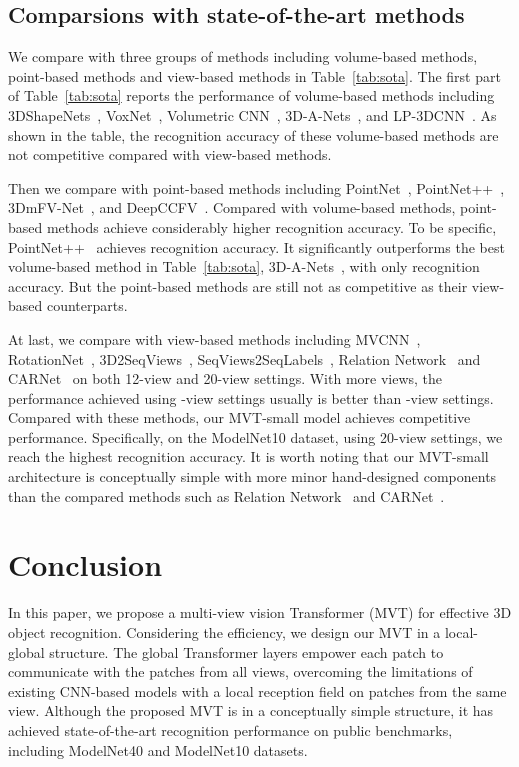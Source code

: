 \documentclass{bmvc2k}
\begin{document}
\subsection{Comparsions with state-of-the-art methods}
We compare with three groups of methods including volume-based methods, point-based methods and view-based methods in Table~\ref{tab:sota}. The first part of  Table~\ref{tab:sota} reports the performance of volume-based methods including 3DShapeNets~\cite{wu20153d}, VoxNet~\cite{maturana2015voxnet}, Volumetric CNN~\cite{qi2016volumetric}, 3D-A-Nets~\cite{ren20173d}, and LP-3DCNN~\cite{LP-3DCNN}. As shown in the table, the recognition accuracy of these volume-based methods are not competitive compared with view-based methods.

Then we compare with point-based methods including PointNet~\cite{pointnet}, PointNet++~\cite{pointnet++}, 3DmFV-Net~\cite{3Dmfv}, and DeepCCFV~\cite{AAAI2019DeepCCFV}. Compared with volume-based methods, point-based methods achieve  considerably higher recognition accuracy. To be specific, PointNet++~\cite{pointnet++} achieves  recognition accuracy. It significantly outperforms the best volume-based method in Table~\ref{tab:sota}, 3D-A-Nets~\cite{ren20173d},  with only  recognition accuracy. But the point-based methods are still not as competitive as their view-based counterparts.

At last, we compare with view-based methods including MVCNN~\cite{su2015multi}, RotationNet~\cite{kanezaki2018rotationnet}, 3D2SeqViews~\cite{DBLP:journals/tip/HanLLVLZHC19}, SeqViews2SeqLabels~\cite{DBLP:journals/tip/HanSLVLZHC19}, Relation Network~\cite{mvrelations} and CAR\-Net~\cite{DBLP:journals/tip/XuZXQL21} on both 12-view and 20-view settings. 
With more views, the performance achieved using  -view settings usually is better than -view settings. Compared with these methods, our MVT-small model achieves competitive performance. Specifically, on the ModelNet10 dataset, using 20-view settings, we reach the highest recognition accuracy. It is worth noting that our MVT-small architecture is conceptually simple with more minor hand-designed components than the compared methods such as Relation Network~\cite{mvrelations} and CAR\-Net~\cite{DBLP:journals/tip/XuZXQL21}.  

\section{Conclusion}
In this paper, we propose a multi-view vision Transformer (MVT) for effective 3D object recognition. Considering the efficiency, we design our MVT in a local-global structure. The global Transformer layers empower each patch to communicate with the patches from all views, overcoming the limitations of existing CNN-based models with a local reception field on patches from the same view. Although the proposed MVT is in a conceptually simple structure, it has achieved state-of-the-art recognition performance on public benchmarks, including ModelNet40 and ModelNet10 datasets.


\end{document}
